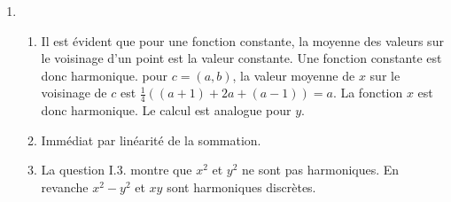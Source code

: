 \begin{enumerate}
\item 
\begin{enumerate}
  \item Il est évident que pour une fonction constante, la moyenne des valeurs sur le voisinage d'un point est la valeur constante. Une fonction constante est donc harmonique.\newline
  pour $c=(a,b)$, la valeur moyenne de $x$ sur le voisinage de $c$ est $\frac{1}{4}((a+1) + 2a + (a-1))=a$. La fonction $x$ est donc harmonique. Le calcul est analogue pour $y$.
  \item Immédiat par linéarité de la sommation.
  \item La question I.3. montre que $x^2$ et $y^2$ ne sont pas harmoniques. En revanche $x^2 - y^2$ et $xy$ sont harmoniques discrètes.
\end{enumerate}

\end{enumerate}
